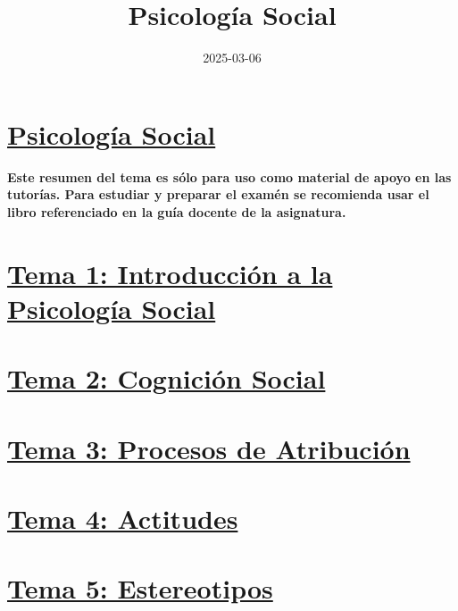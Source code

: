 \documentclass[
]{book}
\title{Psicología Social}
\author{}
\date{\vspace{-2.5em}2025-03-06}
\begin{document}
\maketitle

{
\setcounter{tocdepth}{1}
\tableofcontents
}
\chapter{\texorpdfstring{\href{https://dalarconrub.github.io/psicologia-social/}{Psicología Social}}{Psicología Social}}\label{psicologuxeda-social}

\textbf{Este resumen del tema es sólo para uso como material de apoyo en las tutorías. Para estudiar y preparar el examén se recomienda usar el libro referenciado en la guía docente de la asignatura.}

\chapter{\texorpdfstring{\href{https://dalarconrub.github.io/psicologia-social-tema-1/}{Tema 1: Introducción a la Psicología Social}}{Tema 1: Introducción a la Psicología Social}}\label{tema-1-introducciuxf3n-a-la-psicologuxeda-social}

\chapter{\texorpdfstring{\href{https://dalarconrub.github.io/psicologia-social-tema-2/}{Tema 2: Cognición Social}}{Tema 2: Cognición Social}}\label{tema-2-cogniciuxf3n-social}

\chapter{\texorpdfstring{\href{https://dalarconrub.github.io/psicologia-social-tema-3/}{Tema 3: Procesos de Atribución}}{Tema 3: Procesos de Atribución}}\label{tema-3-procesos-de-atribuciuxf3n}

\chapter{\texorpdfstring{\href{https://dalarconrub.github.io/psicologia-social-tema-4/}{Tema 4: Actitudes}}{Tema 4: Actitudes}}\label{tema-4-actitudes}

\chapter{\texorpdfstring{\href{https://dalarconrub.github.io/psicologia-social-tema-5/}{Tema 5: Estereotipos}}{Tema 5: Estereotipos}}\label{tema-5-estereotipos}
\end{document}
